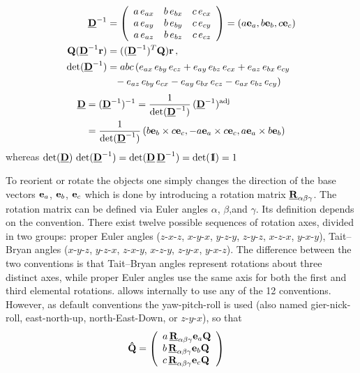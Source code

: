 \begin{align}
\M{D}^{-1} &=
\left(
\begin{array}{ccc}
a\, e_{ax} & b\, e_{bx} & c\, e_{cx} \\
a\, e_{ay} & b\, e_{by} & c\, e_{cy} \\
a\, e_{az} & b\, e_{bz} & c\, e_{cz} \\
\end{array}
\right) = (a\B{e}_a,b\B{e}_b,c\B{e}_c)\\
 \B{Q}(\M{D}^{-1}\B{r}) &= ((\M{D}^{-1})^T\B{Q})\B{r} \U{,}\\
\det(\M{D}^{-1}) &= abc\,
( e_{ax}\, e_{by}\, e_{cz}
+ e_{ay}\, e_{bz}\, e_{cx}
+ e_{az}\, e_{bx}\, e_{cy} \nonumber \\
&\phantom{=} - e_{az}\, e_{by}\, e_{cx}
   - e_{ay}\, e_{bx}\, e_{cz}
   - e_{ax}\, e_{bz}\, e_{cy})
\end{align}
\begin{align}
\M{D} &= (\M{D}^{-1})^{-1} = \frac{1}{\det(\M{D}^{-1})}\,
          (\M{D}^{-1})^{\rm adj} \nonumber \\
&= \frac{1}{\det(\M{D}^{-1})} \, (b\B{e}_b\times c\B{e}_c,-a\B{e}_a
\times c\B{e}_c,a\B{e}_a\times b\B{e}_b)
\end{align}
whereas $\det(\M{D}) \, \det(\M{D}^{-1}) = \det(\M{D}\, \M{D}^{-1}) =\det(\idty) = 1$

To reorient or rotate the objects one simply changes the  direction of the base vectors $\B{e}_a$, $\B{e}_b$, $\B{e}_c$ which is done by introducing a rotation matrix $\M{R}_{\alpha\beta\gamma}$. The rotation matrix can be defined via Euler angles $\alpha$, $\beta$,and $\gamma$. Its definition depends on the convention. There exist twelve possible sequences of rotation axes, divided in two groups: proper Euler angles ($z$-$x$-$z$, $x$-$y$-$x$, $y$-$z$-$y$, $z$-$y$-$z$, $x$-$z$-$x$, $y$-$x$-$y$),
Tait–Bryan angles ($x$-$y$-$z$, $y$-$z$-$x$, $z$-$x$-$y$, $x$-$z$-$y$, $z$-$y$-$x$, $y$-$x$-$z$). The difference between the two conventions is that Tait–Bryan angles represent rotations about three distinct axes, while proper Euler angles use the same axis for both the first and third elemental rotations. \SASfit allows internally to use any of the 12 conventions. However, as default conventions the yaw-pitch-roll is used (also named gier-nick-roll, east-north-up, north-East-Down, or $z$-$y$-$x$),  so that
\begin{align}
\displaystyle \B{\hat{Q}} &=
  \left( \begin{array}{l} a\,\M{R}_{\alpha\beta\gamma}\B{e}_a\B{Q}\\
                          b\,\M{R}_{\alpha\beta\gamma}\B{e}_b\B{Q}\\
                          c\,\M{R}_{\alpha\beta\gamma}\B{e}_c\B{Q}
\end{array}\right)
\label{eq:Q:dach}
\end{align}

